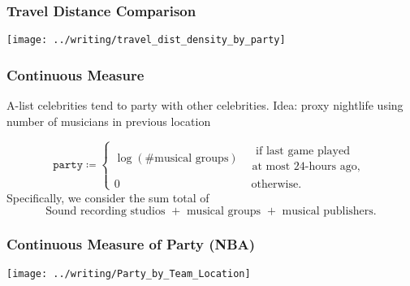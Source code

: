 \documentclass{beamer}
\begin{document}
\begin{frame}   
  \frametitle{Travel Distance Comparison}
  \centering \texttt{[image: ../writing/travel\_dist\_density\_by\_party]} 
\end{frame}


\begin{frame}   \frametitle{Continuous Measure}
  \begin{block}{A-list celebrities tend to party with other celebrities.}     Idea: proxy nightlife using number of musicians in previous location

    \[
      \texttt{party} \coloneqq \begin{cases}       \log \left(\# \textrm{musical groups}\right) &\substack{\textrm{ if last game played} \\ \textrm{at most 24-hours ago,}} \\
      0 &\textrm{ otherwise.}
    \end{cases}
    \]
    \newline
    Specifically, we consider the sum total of
    \[
      \textrm{Sound recording studios } + \textrm{ musical groups } + \textrm{ musical publishers}.
    \]   \end{block} \end{frame}

\begin{frame}   
  \frametitle{Continuous Measure of Party (NBA)}
  \centering \texttt{[image: ../writing/Party\_by\_Team\_Location]} 
\end{frame}
\end{document}
